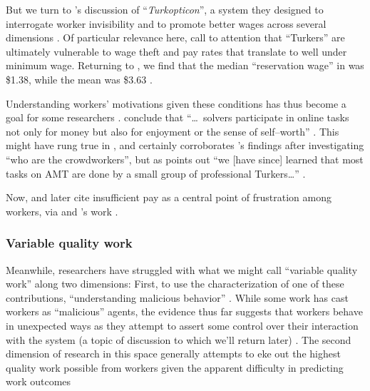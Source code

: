 \documentclass{sigchi}
\begin{document}
But we turn to \citeauthor{turkopticon}'s discussion of ``\textit{Turkopticon}'',
a system they designed to interrogate worker invisibility and to promote better wages across several dimensions
\cite{turkopticon}.
Of particular relevance here,
\citeauthor{turkopticon} call to attention that ``Turkers'' are ultimately vulnerable to
wage theft and
pay rates that translate to well under minimum wage.
Returning to \citeauthor{laborEconomicsOfCrowdsourcingHorton},
we find that the median ``reservation wage'' in \citeyear{laborEconomicsOfCrowdsourcingHorton}
was \$1.38, while the mean was \$3.63
\cite{laborEconomicsOfCrowdsourcingHorton}.

Understanding workers' motivations given these conditions has thus become a goal for some researchers
\cite{whyWouldAnyoneBrewer}.
\citeauthor{Sun20111033} conclude that
``\dots~solvers participate in online tasks
not only for money
but also for enjoyment
or the sense of self--worth''
\cite{Sun20111033}.
This might have rung true in \citeyear{Sun20111033},
and certainly corroborates \citeauthor{Ross}'s findings after investigating
``who are the crowdworkers'',
but as \citeauthor{whoareNOTtheTurkers} points out
``we [have since] learned that most tasks on AMT are done by a small group of professional Turkers\dots''
\cite{Ross,whoareNOTtheTurkers}.

Now, \citeauthor{turkopticon}
and later
\citeauthor{dynamo} cite insufficient pay as a central point of frustration among workers,
via \citeauthor{irani2015cultural} and \citeauthor{dawnDigitalSweatshopCushing}'s work
\cite{dynamo,irani2015cultural,dawnDigitalSweatshopCushing,turkopticon}.


\subsubsection{Variable quality work}\label{sec:varQualWork}
Meanwhile,
researchers have struggled with what we might call ``variable quality work''
along two dimensions:
First, to use the characterization of one of these contributions,
``understanding malicious behavior''
\cite{MaliciousCrowdworkersGadiraju}.
While some work has cast workers as ``malicious'' agents,
the evidence thus far suggests that
workers behave in unexpected ways as they attempt to assert some control over their interaction with the system
(a topic of discussion to which we'll return later)
\cite{uberAlgorithm}.
The second dimension of research in this space generally attempts
to eke out the highest quality work possible from workers
given the apparent difficulty in predicting work outcomes
\end{document}
